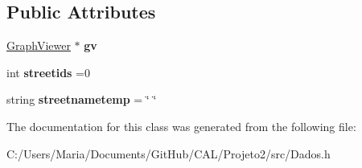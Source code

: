 \subsection*{Public Attributes}
\begin{DoxyCompactItemize}
\item 
\hypertarget{class_dados_aa85aa0887cafc06905c9c552796bc3b2}{}\label{class_dados_aa85aa0887cafc06905c9c552796bc3b2} 
\hyperlink{class_graph_viewer}{Graph\+Viewer} $\ast$ {\bfseries gv}
\item 
\hypertarget{class_dados_a32fe6c7b2371d311355aed39364235f6}{}\label{class_dados_a32fe6c7b2371d311355aed39364235f6} 
int {\bfseries streetids} =0
\item 
\hypertarget{class_dados_a7206dda3ea7bd76f2429003a1703d64e}{}\label{class_dados_a7206dda3ea7bd76f2429003a1703d64e} 
string {\bfseries streetnametemp} = \char`\"{} \char`\"{}
\end{DoxyCompactItemize}


The documentation for this class was generated from the following file\+:\begin{DoxyCompactItemize}
\item 
C\+:/\+Users/\+Maria/\+Documents/\+Git\+Hub/\+C\+A\+L/\+Projeto2/src/Dados.\+h\end{DoxyCompactItemize}
